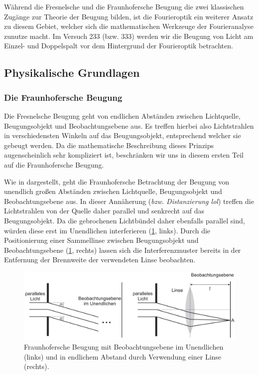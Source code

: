 Während die Fresnelsche und die Fraunhofersche Beugung die zwei \glqq{}klassischen\grqq{} Zugänge zur Theorie der Beugung bilden, ist die Fourieroptik ein weiterer Ansatz zu diesem Gebiet, welcher sich die mathematischen Werkzeuge der Fourieranalyse zunutze macht. Im Versuch 233 (bzw. 333) werden wir die Beugung von Licht am Einzel- und Doppelspalt vor dem Hintergrund der Fourieroptik betrachten.

\subsection{Physikalische Grundlagen}

\subsubsection*{Die Fraunhofersche Beugung}

Die Fresnelsche Beugung geht von endlichen Abständen zwischen Lichtquelle, Beugungsobjekt und Beobachtungsebene aus. Es treffen hierbei also Lichtstrahlen in verschiedensten Winkeln auf das Beugungsobjekt, entsprechend welcher sie gebeugt werden. Da die mathematische Beschreibung dieses Prinzips augenscheinlich sehr kompliziert ist, beschränken wir uns in diesem ersten Teil auf die Fraunhofersche Beugung.

Wie in  dargestellt, geht die Fraunhofersche Betrachtung der Beugung von unendlich großen Abständen zwischen Lichtquelle, Beugungsobjekt und Beobachtungsebene aus. In dieser Annäherung (\textit{bzw. Distanzierung lol}) treffen die Lichtstrahlen von der Quelle daher parallel und senkrecht auf das Beugungsobjekt. Da die gebrochenen Lichtbündel daher ebenfalls parallel sind, würden diese erst im Unendlichen interferieren (\ref{fig:fraunhofer_beugung}, links). Durch die Positionierung einer Sammellinse zwischen Beugungsobjekt und Beobachtungsebene (\ref{fig:fraunhofer_beugung}, rechts) lassen sich die Interferenzmuster bereits in der Entfernung der Brennweite der verwendeten Linse beobachten.

\begin{figure}[H]
  \centering
  \includegraphics[width=.9\textwidth]{files/fraunhofer_beugung.png}
  \caption{Fraunhofersche Beugung mit Beobachtungsebene im Unendlichen (links) und in endlichem Abstand durch Verwendung einer Linse (rechts).}
  \label{fig:fraunhofer_beugung}
\end{figure}

